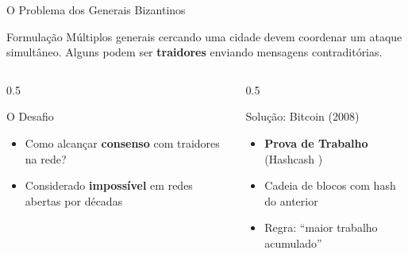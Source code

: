 \documentclass{libs/ufc_format}
\begin{document}
\begin{frame}{O Problema dos Generais Bizantinos}
    \begin{block}{Formulação \cite{lamport1982}}
        Múltiplos generais cercando uma cidade devem coordenar um ataque simultâneo. Alguns podem ser \textbf{traidores} enviando mensagens contraditórias.
    \end{block}

    \vspace{0.2cm}

    \begin{columns}
        \begin{column}{0.5\textwidth}
            \begin{alertblock}{O Desafio}
                \begin{itemize}
                    \item Como alcançar \textbf{consenso} com traidores na rede?
                    \item Considerado \textbf{impossível} em redes abertas por décadas
                \end{itemize}
            \end{alertblock}
        \end{column}
        \begin{column}{0.5\textwidth}
            \begin{exampleblock}{Solução: Bitcoin (2008)}
                \begin{itemize}
                    \item \textbf{Prova de Trabalho} (Hashcash \cite{back2002})
                    \item Cadeia de blocos com hash do anterior
                    \item Regra: ``maior trabalho acumulado''
                \end{itemize}
            \end{exampleblock}
        \end{column}
    \end{columns}

    \vspace{0.2cm}

\end{frame}

\end{document}
